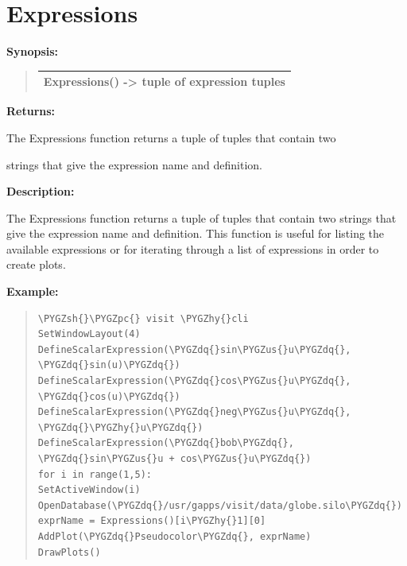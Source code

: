 \documentclass[letterpaper,10pt,english]{sphinxmanual}
\def\PYGZus{\char`\_}
\def\PYGZsh{\char`\#}
\def\PYGZpc{\char`\%}
\def\PYGZhy{\char`\-}
\def\PYGZdq{\char`\"}
\begin{document}
\section{Expressions}
\label{functions:expressions}
\begin{DUlineblock}{0em}
\item[] \textbf{Synopsis:}
\end{DUlineblock}
\begin{quote}

\begin{tabulary}{\linewidth}{|L|}
\hline

Expressions() -\textgreater{} tuple of expression tuples
\\
\hline\end{tabulary}

\end{quote}

\begin{DUlineblock}{0em}
\item[] 
\item[] \textbf{Returns:}
\item[] The Expressions function returns a tuple of tuples that contain two
\item[] strings that give the expression name and definition.
\item[] 
\item[] \textbf{Description:}
\item[] The Expressions function returns a tuple of tuples that contain two
strings that give the expression name and definition. This function is
useful for listing the available expressions or for iterating through a
list of expressions in order to create plots.
\end{DUlineblock}

\begin{DUlineblock}{0em}
\item[] 
\end{DUlineblock}

\begin{DUlineblock}{0em}
\item[] \textbf{Example:}
\item[] 
\end{DUlineblock}
\begin{quote}

\begin{Verbatim}[commandchars=\\\{\}]
\PYGZsh{}\PYGZpc{} visit \PYGZhy{}cli
SetWindowLayout(4)
DefineScalarExpression(\PYGZdq{}sin\PYGZus{}u\PYGZdq{}, \PYGZdq{}sin(u)\PYGZdq{})
DefineScalarExpression(\PYGZdq{}cos\PYGZus{}u\PYGZdq{}, \PYGZdq{}cos(u)\PYGZdq{})
DefineScalarExpression(\PYGZdq{}neg\PYGZus{}u\PYGZdq{}, \PYGZdq{}\PYGZhy{}u\PYGZdq{})
DefineScalarExpression(\PYGZdq{}bob\PYGZdq{}, \PYGZdq{}sin\PYGZus{}u + cos\PYGZus{}u\PYGZdq{})
for i in range(1,5):
SetActiveWindow(i)
OpenDatabase(\PYGZdq{}/usr/gapps/visit/data/globe.silo\PYGZdq{})
exprName = Expressions()[i\PYGZhy{}1][0]
AddPlot(\PYGZdq{}Pseudocolor\PYGZdq{}, exprName)
DrawPlots()
\end{Verbatim}
\end{quote}
\end{document}
